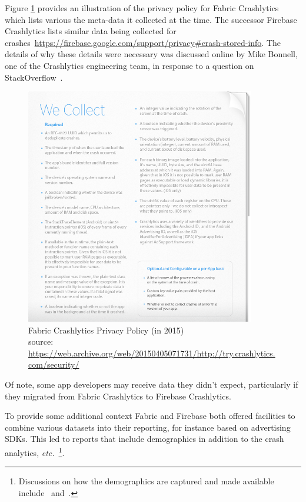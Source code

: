 Figure \ref{fig:fabric-crashlytics-privacy-policy} provides an illustration of the privacy policy for Fabric Crashlytics which lists various the meta-data it collected at the time. The successor Firebase Crashlytics lists similar data being collected for crashes~\url{https://firebase.google.com/support/privacy#crash-stored-info}. The details of why these details were necessary was discussed online by Mike Bonnell, %
one of the Crashlytics engineering team, in response to a question on StackOverflow~\citep{kim2017_what_information_does_crashlytics_collect_from_end_users}.

\begin{figure}
    \centering
    \includegraphics[width=10cm]{images/fabric-crashlytics/crashlytics-privacy-policy-38154ffbd69ef44a478b54365dc9b3ad.png}
    \caption[Fabric Crashlytics Privacy Policy (in 2015)]{Fabric Crashlytics Privacy Policy (in 2015)\\{source: \tiny \url{https://web.archive.org/web/20150405071731/http://try.crashlytics.com/security/}}}
    \label{fig:fabric-crashlytics-privacy-policy}
\end{figure}

Of note, some app developers may receive data they didn't expect, particularly if they migrated from Fabric Crashlytics to Firebase Crashlytics. 

To provide some additional context Fabric and Firebase both offered facilities to combine various datasets into their reporting, for instance based on advertising SDKs. This led to reports that include demographics in addition to the crash analytics, \emph{etc.}~\footnote{Discussions on how the demographics are captured and made available include~\citep{joe2016_firebase_analytics_demographics} and~\citep{chelo2020_firebase_does_not_collect_age_or_gender_data}.}. 

